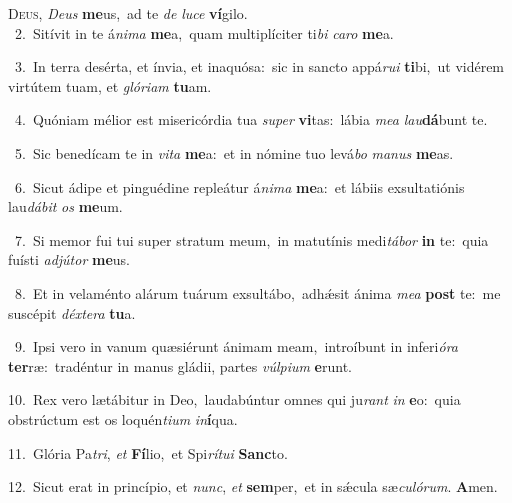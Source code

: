 \lettrine{\initial\textcolor{\initialcolor}{D}}{eus,} \textit{De}\-\textit{us} \textbf{me}\-us,~\star ad te \textit{de} \textit{lu}\-\textit{ce} \textbf{ví}\-gilo.\\
{\numbfont\textcolor{\numbcolor}{~2.}}~Sitívit in te á\-\textit{ni}\-\textit{ma} \textbf{me}\-a,~\star quam multiplíciter ti\textit{bi} \textit{ca}\-\textit{ro} \textbf{me}\-a.\par
{\numbfont\textcolor{\numbcolor}{~3.}}~In terra desérta, et ínvia, et inaquósa:~\dagger sic in sancto appá\-\textit{ru}\-\textit{i} \textbf{ti}\-bi,~\star ut vidérem virtútem tuam, et \textit{gló}\-\textit{ri}\textit{am} \textbf{tu}\-am.\par
{\numbfont\textcolor{\numbcolor}{~4.}}~Quóniam mélior est misericórdia tua \textit{su}\-\textit{per} \textbf{vi}\-tas:~\star lábia \textit{me}\-\textit{a} \textit{lau}\-\textbf{dá}bunt te.\par
{\numbfont\textcolor{\numbcolor}{~5.}}~Sic benedícam te in \textit{vi}\-\textit{ta} \textbf{me}\-a:~\star et in nómine tuo levá\textit{bo} \textit{ma}\-\textit{nus} \textbf{me}\-as.\par
{\numbfont\textcolor{\numbcolor}{~6.}}~Sicut ádipe et pinguédine repleátur á\-\textit{ni}\-\textit{ma} \textbf{me}\-a:~\star et lábiis exsultatiónis lau\-\textit{dá}\-\textit{bit} \textit{os} \textbf{me}\-um.\par
{\numbfont\textcolor{\numbcolor}{~7.}}~Si memor fui tui super stratum meum,~\dagger in matutínis medi\-\textit{tá}\-\textit{bor} \textbf{in} te:~\star quia fuísti \textit{ad}\-\textit{jú}\textit{tor} \textbf{me}\-us.\par
{\numbfont\textcolor{\numbcolor}{~8.}}~Et in velaménto alárum tuárum exsultábo,~\dagger adhǽsit ánima \textit{me}\-\textit{a} \textbf{post} te:~\star me suscépit \textit{déx}\-\textit{te}\textit{ra} \textbf{tu}\-a.\par
{\numbfont\textcolor{\numbcolor}{~9.}}~Ipsi vero in vanum quæsiérunt ánimam meam,~\dagger introíbunt in inferi\-\textit{ó}\-\textit{ra} \textbf{ter}\-ræ:~\star tradéntur in manus gládii, partes \textit{vúl}\-\textit{pi}\textit{um} \textbf{e}\-runt.\par
{\numbfont\textcolor{\numbcolor}{10.}}~Rex vero lætábitur in Deo,~\dagger laudabúntur omnes qui ju\textit{rant} \textit{in} \textbf{e}\-o:~\star quia obstrúctum est os loquén\-\textit{ti}\-\textit{um} \textit{in}\-\textbf{í}qua.\par
{\numbfont\textcolor{\numbcolor}{11.}}~Glória Pa\-\textit{tri}\-, \textit{et} \textbf{Fí}\-lio,~\star et Spi\-\textit{rí}\-\textit{tu}\textit{i} \textbf{Sanc}\-to.\par
{\numbfont\textcolor{\numbcolor}{12.}}~Sicut erat in princípio, et \textit{nunc}\-, \textit{et} \textbf{sem}\-per,~\star et in sǽcula sæ\-\textit{cu}\-\textit{ló}\textit{rum}. \textbf{A}\-men.\par
